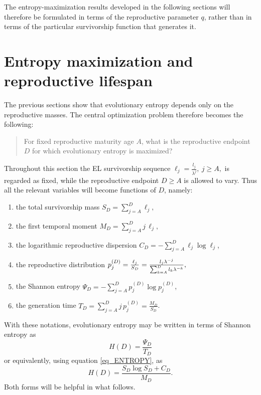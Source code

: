 \documentclass[10pt,a4paper]{amsart}
\theoremstyle{definition}
\theoremstyle{remark}
\numberwithin{equation}{section}
\begin{document}
The entropy-maximization results developed in the following sections
will therefore be formulated in terms of the reproductive parameter
\(q\), rather than in terms of the particular survivorship function
that generates it.

\FloatBarrier

\section{Entropy maximization and reproductive lifespan}
\label{sec_entropy_maximization}

The previous sections show that evolutionary entropy depends
only on the reproductive masses. The central optimization problem therefore becomes the
following:

\begin{quote}
For fixed reproductive maturity age \(A\), what is the reproductive
endpoint \(D\) for which evolutionary entropy is maximized?
\end{quote}

Throughout this section the EL survivorship sequence $
\ell_j
=
{\displaystyle \frac{l_j}{\lambda^j},}
\ j\ge A,
$
is regarded as fixed, while the reproductive endpoint
$
D\ge A
$
is allowed to vary. Thus all the relevant variables will become functions of $D$, namely:

\begin{enumerate}
	\item the total survivorship mass $S_D
	=	\sum_{j=A}^{D}\ell_j,$
	\item  the first temporal moment $M_D
	=
	\sum_{j=A}^{D} j\,\ell_j,$
	\item the logarithmic reproductive dispersion $ C_D
	=
	-\sum_{j=A}^{D}
	\ell_j\log \ell_j$,
	\item the reproductive distribution $
		p_j^{(D)}
		=
		\frac{\ell_j}{S_D}
		=
		\frac{
			l_j\lambda^{-j}
		}{
			\sum_{k=A}^{D}
			l_k\lambda^{-k}
		},$
		\item the Shannon entropy $\Psi_D
		=
		-
		\sum_{j=A}^{D}
		p_j^{(D)}
		\log p_j^{(D)}$,
		\item the generation time 
$T_D
=
\sum_{j=A}^{D}
j\,p_j^{(D)}
=
\frac{M_D}{S_D}$.
\end{enumerate}

With these notations,  evolutionary entropy may be written in terms
of Shannon entropy as
\begin{equation}
	\label{eq_EE_Shannon}
	H(D)
	=
	\frac{\Psi_D}{T_D}
\end{equation}
or equivalently, using equation \eqref{eq_ENTROPY}, as
\begin{equation}
	\label{eq:HD-basic}
	H(D)
	=
	\frac{
		S_D\log S_D
		+
		C_D
	}{
		M_D
	}.
\end{equation}
Both forms will be helpful in what follows.
\end{document}
